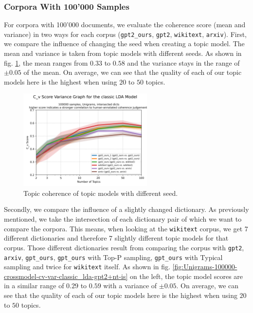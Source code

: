 \subsubsection{Corpora With 100'000 Samples}
For corpora with 100'000 documents, we evaluate the coherence score (mean and variance) in two ways for each corpus (\texttt{gpt2\_ours}, \texttt{gpt2}, \texttt{wikitext}, \texttt{arxiv}). First, we compare the influence of changing the seed when creating a topic model. The mean and variance is taken from topic models with different seeds. As shown in fig. \ref{fig:Unigrams-100000-var-cv-is}, the mean ranges from $0.33$ to $0.58$ and the variance stays in the range of $\pm0.05$ of the mean. On average, we can see that the quality of each of our topic models here is the highest when using $20$ to $50$ topics.
\begin{figure}[H]
    \centering
    \includegraphics[width=0.6\textwidth]{figures/Unigrams-100000-var-cv-is}
    \caption{Topic coherence of topic models with different seed.}
    \label{fig:Unigrams-100000-var-cv-is}
\end{figure}
Secondly, we compare the influence of a slightly changed dictionary. As previously mentioned, we take the intersection of each dictionary pair of which we want to compare the corpora. This means, when looking at the \texttt{wikitext} corpus, we get 7 different dictionaries and therefore 7 slightly different topic models for that corpus. Those different dictionaries result from comparing the corpus with \texttt{gpt2}, \texttt{arxiv}, \texttt{gpt\_ours}, \texttt{gpt\_ours} with Top-P sampling, \texttt{gpt\_ours} with Typical sampling and twice for \texttt{wikitext} itself. As shown in fig. \ref{fig:Unigrams-100000-crossmodel-cv-var-classic_lda-gpt2+nt-is} on the left, the topic model scores are in a similar range of $0.29$ to $0.59$ with a variance of $\pm0.05$. On average, we can see that the quality of each of our topic models here is the highest when using $20$ to $50$ topics. 

